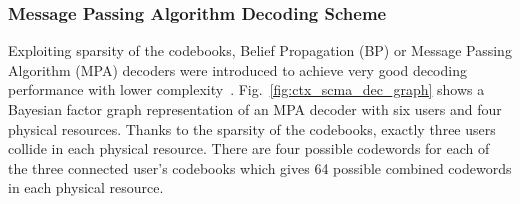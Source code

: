 \subsubsection{Message Passing Algorithm Decoding Scheme}
\label{sec:ctx_scma_detection}





Exploiting sparsity of the codebooks, Belief Propagation (BP) or Message Passing
Algorithm (MPA) decoders were introduced to achieve very good decoding
performance with lower complexity~\cite{Zhang2014a}.
Fig.~\ref{fig:ctx_scma_dec_graph} shows a Bayesian factor graph representation
of an MPA decoder with six users and four physical resources. Thanks to the
sparsity of the codebooks, exactly three users collide in each physical
resource. There are four possible codewords for each of the three connected
user's codebooks which gives 64 possible combined codewords in each physical
resource.

